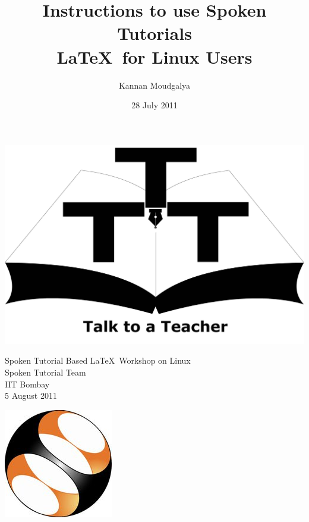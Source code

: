 \documentclass[11pt]{article}
\title{Instructions to use Spoken Tutorials \\
\LaTeX\ for Linux Users}
\author{Kannan Moudgalya}
\date{28 July 2011}
\begin{document}
\begin{minipage}[t]{0.15\textwidth}
\includegraphics[width=\linewidth]{3t-logo}
\end{minipage} \hfill
\begin{minipage}[t]{0.65\textwidth}
\begin{center}
\vspace{-0.7in}
\Large
Spoken Tutorial Based \LaTeX\ Workshop on Linux \\
\large
Spoken Tutorial Team \\
IIT Bombay \\
5 August 2011
\end{center}
\end{minipage} \hfill
\begin{minipage}[t]{0.12\textwidth}
\includegraphics[width=\linewidth]{st-logo.jpg}
\end{minipage}
\end{document}
